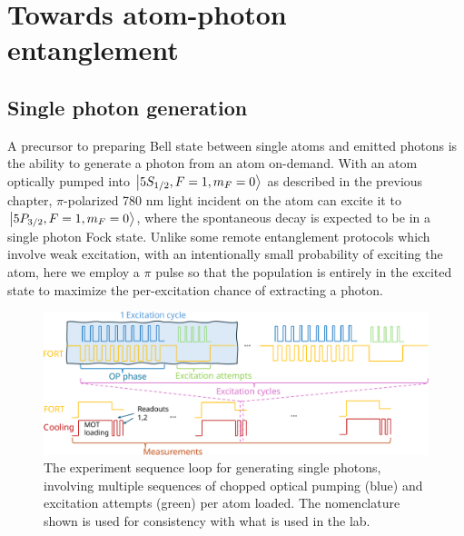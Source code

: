 \chapter{Towards atom-photon entanglement}\label{ch:atomphoton}


\section{Single photon generation}
A precursor to preparing Bell state between single atoms and emitted photons is the ability to generate a photon from an atom on-demand. With an atom optically pumped into $\ket{5S_{1/2},F=1,m_F=0}$ as described in the previous chapter, $\pi$-polarized 780 nm light incident on the atom can excite it to $\ket{5P_{3/2},F=1,m_F=0}$, where the spontaneous decay is expected to be in a single photon Fock state. Unlike some remote entanglement protocols which involve weak excitation\cite{cabrillo1999creation}, with an intentionally small probability of exciting the atom, here we employ a $\pi$ pulse so that the population is entirely in the excited state to maximize the per-excitation chance of extracting a photon. 

\begin{figure}[!h]
    \centering
    \includegraphics[width=\textwidth]{Images/single_photon_experiment_sequence.pdf}
    \caption{The experiment sequence loop for generating single photons, involving multiple sequences of chopped optical pumping (blue) and excitation attempts (green) per atom loaded. The nomenclature shown is used for consistency with what is used in the lab.}
    \label{fig:single_photon_sequence}
\end{figure}

